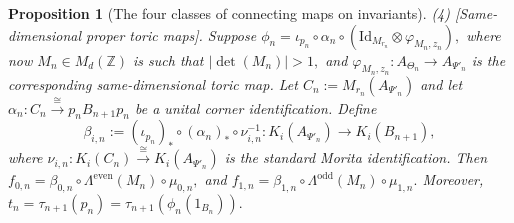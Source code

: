 \documentclass[11pt]{amsart}
\newtheorem{proposition}[theorem]{Proposition}
\theoremstyle{definition}
\theoremstyle{remark}
\newcommand{\Z}{\mathbb{Z}}
\newcommand{\id}{\mathrm{Id}}
\begin{document}
\begin{proposition}[The four classes of connecting maps on invariants]
\noindent

\emph{(4) [Same-dimensional proper toric maps].}
Suppose $\phi_n=\iota_{p_n}\circ\alpha_n\circ (\id_{M_{r_n}}\otimes\varphi_{M_n,z_n}),$
where now $M_n\in M_d(\Z)$ is such that
$|\det(M_n)|>1,$ and $\varphi_{M_n,z_n}:A_{\Theta_n}\to A_{\Psi'_n}$
is the corresponding same-dimensional toric map. Let
$C_n:=M_{r_n}(A_{\Psi'_n})$ and let $\alpha_n:C_n\xrightarrow{\cong}p_nB_{n+1}p_n$
be a unital corner identification. Define 
\[
\beta_{i,n}:=(\iota_{p_n})_*\circ(\alpha_n)_*\circ \nu_{i,n}^{-1}
:K_i(A_{\Psi'_n})\longrightarrow K_i(B_{n+1}),
\]
where $\nu_{i,n}:K_i(C_n)\xrightarrow{\cong}K_i(A_{\Psi'_n})$
is the standard Morita identification. Then $f_{0,n}
=\beta_{0,n}\circ \Lambda^{\mathrm{even}}(M_n)\circ \mu_{0,n},$
and $f_{1,n}=\beta_{1,n}\circ \Lambda^{\mathrm{odd}}(M_n)\circ \mu_{1,n}.$
Moreover, $t_n=\tau_{n+1}(p_n)=\tau_{n+1}(\phi_n(1_{B_n})).$
\end{proposition}
\end{document}
